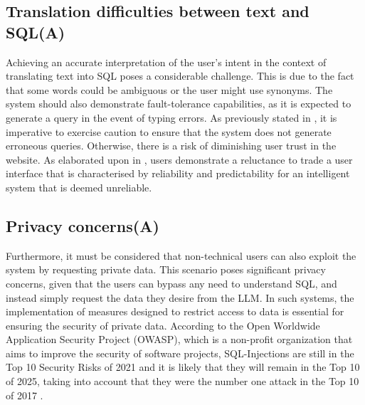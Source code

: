 \documentclass[../../submission.tex]{subfiles}
\begin{document}
\subsection{Translation difficulties between text and SQL(A)}
Achieving an accurate interpretation of the user's intent in the context of translating text into SQL poses a considerable challenge. 
This is due to the fact that some words could be ambiguous or the user might use synonyms.  
The system should also demonstrate fault-tolerance capabilities, as it is expected to generate a query in the event of typing errors. 
As previously stated in \cite{popescuEtalTowardsTheoryOfNaturalLanguage}, it is imperative to exercise caution to ensure that the system does not generate erroneous queries. 
Otherwise, there is a risk of diminishing user trust in the website.  
As elaborated upon in  \cite{popescuEtalTowardsTheoryOfNaturalLanguage}, users demonstrate a reluctance to trade a user interface that is characterised by reliability and predictability for an intelligent system that is deemed unreliable.


\subsection{Privacy concerns(A)}
Furthermore, it must be considered that non-technical users can also exploit the system by requesting private data. 
This scenario poses significant privacy concerns, given that the users can bypass any need to understand SQL, and instead simply request the data they desire from the LLM. 
In such systems, the implementation of measures designed to restrict access to data is essential for ensuring the security of private data.
According to the Open Worldwide Application Security Project (OWASP), which is a 
non-profit organization that aims to improve the security of software projects,
SQL-Injections are still in the Top 10 Security Risks of 2021 and it is likely that 
they will remain in the Top 10 of 2025, taking into account that they were the number
one attack in the Top 10 of 2017 \cite{owaspfoundationOWASPTopTen2024}.
\end{document}
